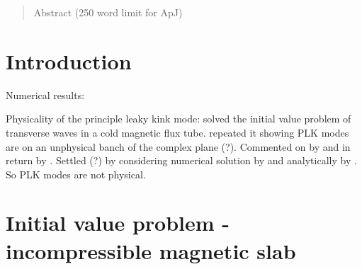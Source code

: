 \documentclass{aastex61}
\begin{document}

\author[0000-0002-0771-743X]{Matthew Allcock}

\author[0000-0003-3439-4127]{Robert Erd\'{e}lyi}


\begin{abstract}

Abstract (250 word limit for ApJ)

\end{abstract}


\section{Introduction} \label{sec:intro}
Numerical results: \cite{ter_etal06}

Physicality of the principle leaky kink mode: \cite{cal03} solved the initial value problem of transverse waves in a cold magnetic flux tube. \cite{rud_etal06} repeated it showing PLK modes are on an unphysical banch of the complex plane (?). Commented on by \cite{cal06} and in return by \cite{rud_etal06b}. Settled (?) by considering numerical solution by \cite{ter_etal07} and analytically by \cite{and_etal07}. So PLK modes are not physical.

\section{Initial value problem - incompressible magnetic slab}
\end{document}
